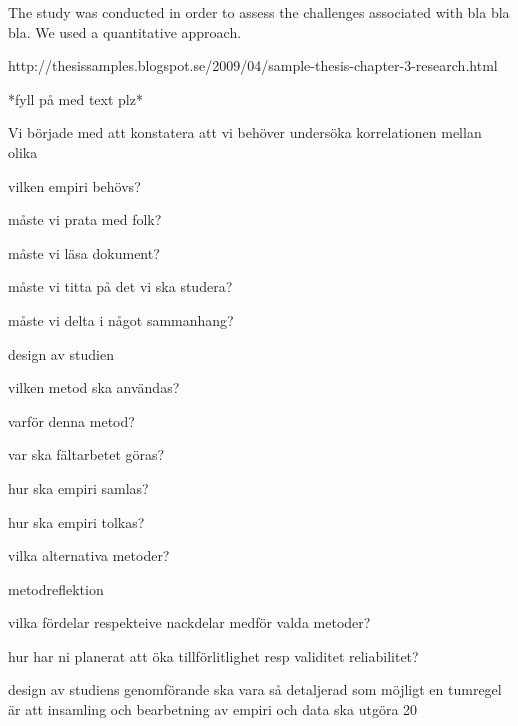 

The study was conducted in order to assess the challenges associated with bla bla bla. We used a quantitative approach.


http://thesissamples.blogspot.se/2009/04/sample-thesis-chapter-3-research.html

*fyll på med text plz*

Vi började med att konstatera att vi behöver undersöka korrelationen mellan olika

vilken empiri behövs?

måste vi prata med folk?

måste vi läsa dokument?

måste vi titta på det vi ska studera?

måste vi delta i något sammanhang?

design av studien

vilken metod ska användas?

varför denna metod?

var ska fältarbetet göras?

hur ska empiri samlas?

hur ska empiri tolkas?

vilka alternativa metoder?

metodreflektion

vilka fördelar respekteive nackdelar medför valda metoder?

hur har ni planerat att öka tillförlitlighet resp validitet reliabilitet?

design av studiens genomförande ska vara så detaljerad som möjligt
en tumregel är att insamling och bearbetning av empiri och data ska utgöra 20%

